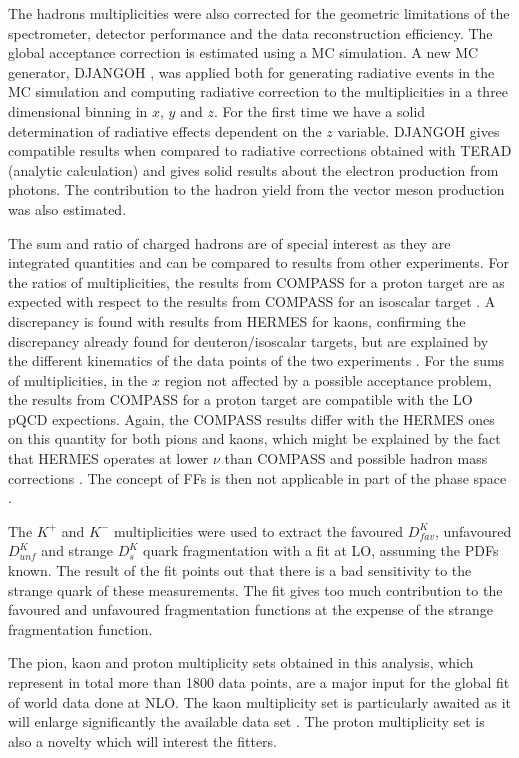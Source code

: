 The hadrons multiplicities were also corrected for the geometric limitations of the spectrometer, detector performance and the data reconstruction efficiency. The global acceptance correction is estimated using a MC simulation. A new MC generator, DJANGOH \cite{DJANGOH,DJANGOHnote}, was applied both for generating radiative events in the MC simulation and computing radiative correction to the multiplicities in a three dimensional binning in $x$, $y$ and $z$. For the first time we have a solid determination of radiative effects dependent on the $z$ variable. DJANGOH gives compatible results when compared to radiative corrections obtained with TERAD (analytic calculation) and gives solid results about the electron production from photons. The contribution to the hadron yield from the vector meson production was also estimated.

The sum and ratio of charged hadrons are of special interest as they are integrated quantities and can be compared to results from other experiments. For the ratios of multiplicities, the results from COMPASS for a proton target are as expected with respect to the results from COMPASS for an isoscalar target \cite{COMPASS2006Pi,COMPASS2006K}. A discrepancy is found with results from HERMES \cite{HERMESMult} for kaons, confirming the discrepancy already found for deuteron/isoscalar targets, but are explained by the different kinematics of the data points of the two experiments \cite{MarcinPubli}. For the sums of multiplicities, in the $x$ region not affected by a possible acceptance problem, the results from COMPASS for a proton target are compatible with the LO pQCD expections. Again, the COMPASS results differ with the HERMES ones on this quantity for both pions and kaons, which might be explained by the fact that HERMES operates at lower $\nu$ than COMPASS and possible hadron mass corrections \cite{Accardi,MarcinPubli}. The concept of FFs is then not applicable in part of the phase space \cite{MarcinPubli}.

The $K^+$ and $K^-$ multiplicities were used to extract the favoured $D^{K}_{fav}$, unfavoured $D^{K}_{unf}$ and strange $D^{K}_{s}$ quark fragmentation with a fit at LO, assuming the PDFs known. The result of the fit points out that there is a bad sensitivity to the strange quark of these measurements. The fit gives too much contribution to the favoured and unfavoured fragmentation functions at the expense of the strange fragmentation function.

The pion, kaon and proton multiplicity sets obtained in this analysis, which represent in total more than 1800 data points, are a major input for the global fit of world data done at NLO. The kaon multiplicity set is particularly awaited as it will enlarge significantly the available data set \cite{DIS2019}. The proton multiplicity set is also a novelty which will interest the fitters.

